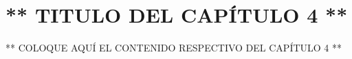 \chapter{** TITULO DEL CAPÍTULO 4 **}
\thispagestyle{empty}

** COLOQUE AQUÍ EL CONTENIDO RESPECTIVO DEL CAPÍTULO 4 **